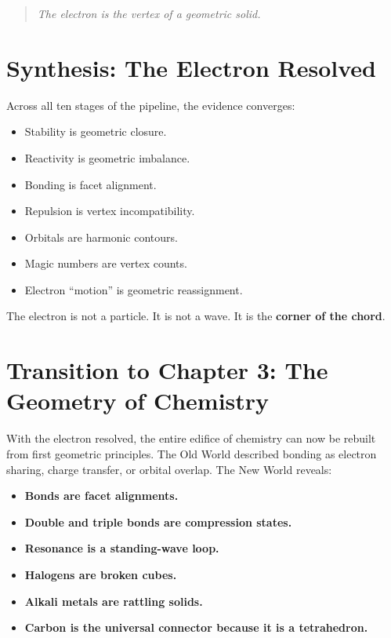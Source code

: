 \documentclass[11pt, letterpaper, openany]{book}
\begin{document}
\begin{quote}
\textit{The electron is the vertex of a geometric solid.}
\end{quote}

\section{Synthesis: The Electron Resolved}

Across all ten stages of the pipeline, the evidence converges:

\begin{itemize}
    \item Stability is geometric closure.
    \item Reactivity is geometric imbalance.
    \item Bonding is facet alignment.
    \item Repulsion is vertex incompatibility.
    \item Orbitals are harmonic contours.
    \item Magic numbers are vertex counts.
    \item Electron “motion” is geometric reassignment.
\end{itemize}

The electron is not a particle.  
It is not a wave.  
It is the \textbf{corner of the chord}.

\section{Transition to Chapter 3: The Geometry of Chemistry}

With the electron resolved, the entire edifice of chemistry can now be rebuilt from first
geometric principles. The Old World described bonding as electron sharing, charge
transfer, or orbital overlap. The New World reveals:

\begin{itemize}
    \item \textbf{Bonds are facet alignments.}
    \item \textbf{Double and triple bonds are compression states.}
    \item \textbf{Resonance is a standing-wave loop.}
    \item \textbf{Halogens are broken cubes.}
    \item \textbf{Alkali metals are rattling solids.}
    \item \textbf{Carbon is the universal connector because it is a tetrahedron.}
\end{itemize}
\end{document}
